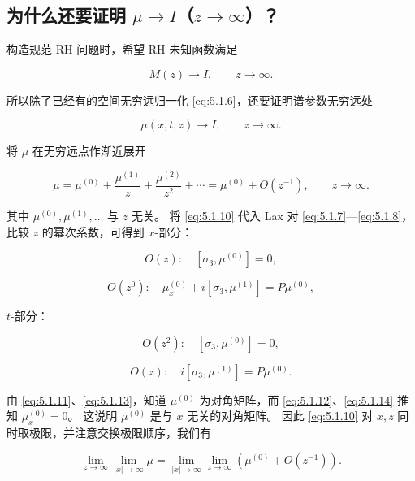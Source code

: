 \documentclass[
    lang=cn,
    scheme=chinese,
    mode=simple,
    device=normal,
    color=blue,
    math=cm,
    thmcnt=section,
    12pt,
    nowatermark
]{elegantbook}
\begin{document}
\subsection{为什么还要证明 \texorpdfstring{$\mu\to I$}{μ → I}（\texorpdfstring{$z\to\infty$}{z → ∞}）？}

构造规范 RH 问题时，希望 RH 未知函数满足

\[
    M(z)\to I,\qquad z\to\infty.
\]

所以除了已经有的空间无穷远归一化 \eqref{eq:5.1.6}，还要证明谱参数无穷远处

\[
    \mu(x,t,z)\to I,\qquad z\to\infty.
\]

将 $\mu$ 在无穷远点作渐近展开

\begin{equation}
    \mu
    =
    \mu^{(0)}
    +\dfrac{\mu^{(1)}}{z}
    +\dfrac{\mu^{(2)}}{z^2}
    +\cdots
    =
    \mu^{(0)}+O(z^{-1}),
    \qquad z\to\infty.
    \tag{5.1.10}
    \label{eq:5.1.10}
\end{equation}

其中 $\mu^{(0)},\mu^{(1)},\ldots$ 与 $z$ 无关。
将 \eqref{eq:5.1.10} 代入 Lax 对 \eqref{eq:5.1.7}---\eqref{eq:5.1.8}，比较 $z$ 的幂次系数，可得到 $x$-部分：

\begin{equation}
    O(z):\quad[\sigma_3,\mu^{(0)}]=0,
    \tag{5.1.11}
    \label{eq:5.1.11}
\end{equation}

\begin{equation}
    O(z^0):\quad\mu_x^{(0)}+i[\sigma_3,\mu^{(1)}]=P\mu^{(0)},
    \tag{5.1.12}
    \label{eq:5.1.12}
\end{equation}

$t$-部分：

\begin{equation}
    O(z^2):\quad[\sigma_3,\mu^{(0)}]=0,
    \tag{5.1.13}
    \label{eq:5.1.13}
\end{equation}

\begin{equation}
    O(z):\quad i[\sigma_3,\mu^{(1)}]=P\mu^{(0)}.
    \tag{5.1.14}
    \label{eq:5.1.14}
\end{equation}

由 \eqref{eq:5.1.11}、\eqref{eq:5.1.13}，知道 $\mu^{(0)}$ 为对角矩阵，而 \eqref{eq:5.1.12}、\eqref{eq:5.1.14} 推知 $\mu_x^{(0)}=0$。
这说明 $\mu^{(0)}$ 是与 $x$ 无关的对角矩阵。
因此 \eqref{eq:5.1.10} 对 $x,z$ 同时取极限，并注意交换极限顺序，我们有

\[
    \lim\limits_{z\to\infty}\lim\limits_{\lvert x\rvert\to\infty}\mu
    =
    \lim\limits_{\lvert x\rvert\to\infty}\lim\limits_{z\to\infty}\left(\mu^{(0)}+O(z^{-1})\right).
\]
\end{document}
